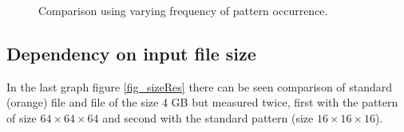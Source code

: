 \begin{figure}
\begin{minipage}{.5\linewidth}
\centering
{}
\end{minipage}%
\begin{minipage}{.5\linewidth}
\centering
{}
\end{minipage}\par\medskip

\caption{Comparison using varying frequency of pattern occurrence.}
\label{fig_patRes}
\end{figure}

\subsection{Dependency on input file size}
In the last graph figure \ref{fig_sizeRes} there can be seen comparison of standard (orange) file and file of the size 4 GB but measured twice, first with the pattern of size $64\times64\times64$ and second with the standard pattern (size $16\times16\times16$).

